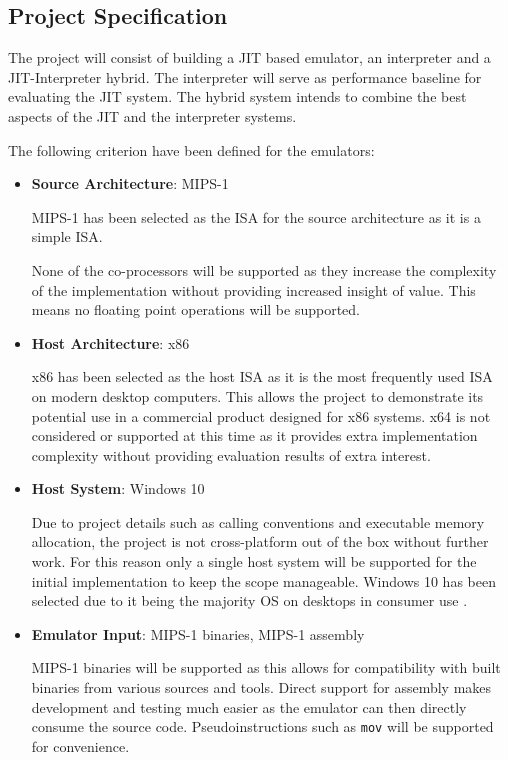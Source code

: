 \subsection{Project Specification}

The project will consist of building a JIT based emulator, an interpreter and a JIT-Interpreter hybrid. The interpreter will serve as performance baseline for evaluating the JIT system. The hybrid system intends to combine the best aspects of the JIT and the interpreter systems.

The following criterion have been defined for the emulators:

\begin{itemize}
    \item \textbf{Source Architecture}: MIPS-1
    
    MIPS-1 has been selected as the ISA for the source architecture as it is a simple ISA. 

    None of the co-processors will be supported as they increase the complexity of the implementation without providing increased insight of value. This means no floating point operations will be supported.
    
    \item \textbf{Host Architecture}: x86
    
    x86 has been selected as the host ISA as it is the most frequently used ISA on modern desktop computers. This allows the project to demonstrate its potential use in a commercial product designed for x86 systems. x64 is not considered or supported at this time as it provides extra implementation complexity without providing evaluation results of extra interest.
    
    \item \textbf{Host System}: Windows 10
    
    Due to project details such as calling conventions and executable memory allocation, the project is not cross-platform out of the box without further work. For this reason only a single host system will be supported for the initial implementation to keep the scope manageable. Windows 10 has been selected due to it being the majority OS on desktops in consumer use \cite{desktop-os-share, win-os-share}.
    
    \item \textbf{Emulator Input}: MIPS-1 binaries, MIPS-1 assembly
    
    MIPS-1 binaries will be supported as this allows for compatibility with built binaries from various sources and tools. Direct support for assembly makes development and testing much easier as the emulator can then directly consume the source code. Pseudoinstructions such as \texttt{mov} will be supported for convenience.


\end{itemize}

